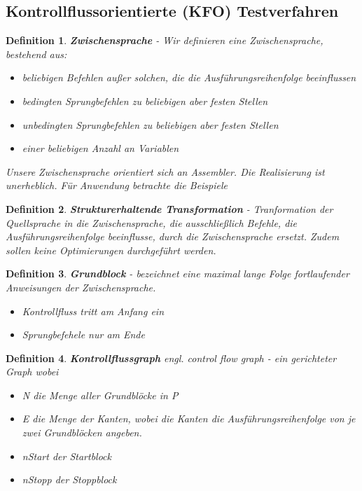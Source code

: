 \documentclass[a4paper]{article}
\theoremstyle{break}
\newtheorem{defi}{Definition}[section]
\begin{document}
        \subsection{Kontrollflussorientierte (KFO) Testverfahren}
        \begin{defi}
          \textbf{Zwischensprache} - Wir definieren eine Zwischensprache, bestehend aus:
          \begin{itemize}
          \item beliebigen Befehlen außer solchen, die die Ausführungsreihenfolge beeinflussen
          \item bedingten Sprungbefehlen zu beliebigen aber festen Stellen
          \item unbedingten Sprungbefehlen zu beliebigen aber festen Stellen
          \item einer beliebigen Anzahl an Variablen
          \end{itemize}
          Unsere Zwischensprache orientiert sich an Assembler.
          Die Realisierung ist unerheblich.
          Für Anwendung betrachte die Beispiele
        \end{defi}

        \begin{defi}
          \textbf{Strukturerhaltende Transformation} - Tranformation der Quellsprache in die Zwischensprache, die ausschließlich Befehle, die Ausführungsreihenfolge beeinflusse, durch die Zwischensprache ersetzt.
          Zudem sollen keine Optimierungen durchgeführt werden.
        \end{defi}

        \begin{defi}
          \textbf{Grundblock} - bezeichnet eine maximal lange Folge fortlaufender Anweisungen der Zwischensprache.
          \begin{itemize}
          \item Kontrollfluss tritt am Anfang ein
          \item Sprungbefehele nur am Ende
          \end{itemize}
        \end{defi}

        \begin{defi}
          \textbf{Kontrollflussgraph} \textit{engl. control flow graph} - ein gerichteter Graph wobei
          \begin{itemize}
          \item N die Menge aller Grundblöcke in P
          \item E die Menge der Kanten, wobei die Kanten die Ausführungsreihenfolge von je zwei Grundblöcken angeben.
          \item nStart der Startblock
          \item nStopp der Stoppblock
          \end{itemize}
        \end{defi}
\end{document}
